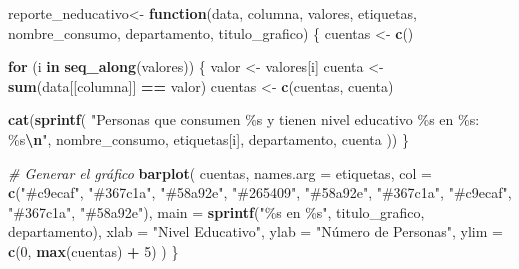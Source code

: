 \documentclass[
]{article}
\newenvironment{Shaded}{\begin{snugshade}}{\end{snugshade}}
\newcommand{\AttributeTok}[1]{\textcolor[rgb]{0.13,0.29,0.53}{#1}}
\newcommand{\CommentTok}[1]{\textcolor[rgb]{0.56,0.35,0.01}{\textit{#1}}}
\newcommand{\ControlFlowTok}[1]{\textcolor[rgb]{0.13,0.29,0.53}{\textbf{#1}}}
\newcommand{\DecValTok}[1]{\textcolor[rgb]{0.00,0.00,0.81}{#1}}
\newcommand{\FunctionTok}[1]{\textcolor[rgb]{0.13,0.29,0.53}{\textbf{#1}}}
\newcommand{\NormalTok}[1]{#1}
\newcommand{\OtherTok}[1]{\textcolor[rgb]{0.56,0.35,0.01}{#1}}
\newcommand{\SpecialCharTok}[1]{\textcolor[rgb]{0.81,0.36,0.00}{\textbf{#1}}}
\newcommand{\StringTok}[1]{\textcolor[rgb]{0.31,0.60,0.02}{#1}}
\begin{document}
\label{section6}
\begin{Shaded}
\begin{Highlighting}[]
\NormalTok{reporte\_neducativo}\OtherTok{\textless{}{-}} \ControlFlowTok{function}\NormalTok{(data, columna, valores, etiquetas, nombre\_consumo, departamento, titulo\_grafico) \{}
\NormalTok{  cuentas }\OtherTok{\textless{}{-}} \FunctionTok{c}\NormalTok{()}
  
  \ControlFlowTok{for}\NormalTok{ (i }\ControlFlowTok{in} \FunctionTok{seq\_along}\NormalTok{(valores)) \{}
\NormalTok{    valor }\OtherTok{\textless{}{-}}\NormalTok{ valores[i]}
\NormalTok{    cuenta }\OtherTok{\textless{}{-}} \FunctionTok{sum}\NormalTok{(data[[columna]] }\SpecialCharTok{==}\NormalTok{ valor)}
\NormalTok{    cuentas }\OtherTok{\textless{}{-}} \FunctionTok{c}\NormalTok{(cuentas, cuenta)}
    
    \FunctionTok{cat}\NormalTok{(}\FunctionTok{sprintf}\NormalTok{(}
      \StringTok{"Personas que consumen \%s y tienen nivel educativo \%s en \%s: \%s}\SpecialCharTok{\textbackslash{}n}\StringTok{"}\NormalTok{, }
\NormalTok{      nombre\_consumo, etiquetas[i], departamento, cuenta}
\NormalTok{    ))}
\NormalTok{  \}}
  
  \CommentTok{\# Generar el gráfico}
  \FunctionTok{barplot}\NormalTok{(}
\NormalTok{    cuentas,}
    \AttributeTok{names.arg =}\NormalTok{ etiquetas,}
    \AttributeTok{col =} \FunctionTok{c}\NormalTok{(}\StringTok{"\#c9ecaf"}\NormalTok{, }\StringTok{"\#367c1a"}\NormalTok{, }\StringTok{"\#58a92e"}\NormalTok{, }\StringTok{"\#265409"}\NormalTok{, }\StringTok{"\#58a92e"}\NormalTok{, }\StringTok{"\#367c1a"}\NormalTok{, }\StringTok{"\#c9ecaf"}\NormalTok{, }\StringTok{"\#367c1a"}\NormalTok{, }\StringTok{"\#58a92e"}\NormalTok{),}
    \AttributeTok{main =} \FunctionTok{sprintf}\NormalTok{(}\StringTok{"\%s en \%s"}\NormalTok{, titulo\_grafico, departamento),}
    \AttributeTok{xlab =} \StringTok{"Nivel Educativo"}\NormalTok{,}
    \AttributeTok{ylab =} \StringTok{"Número de Personas"}\NormalTok{,}
    \AttributeTok{ylim =} \FunctionTok{c}\NormalTok{(}\DecValTok{0}\NormalTok{, }\FunctionTok{max}\NormalTok{(cuentas) }\SpecialCharTok{+} \DecValTok{5}\NormalTok{)}
\NormalTok{  )}
\NormalTok{\}}


\end{Highlighting}
\end{Shaded}
\end{document}
